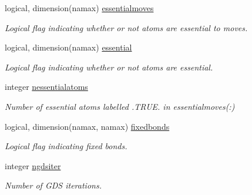 \begin{DoxyCompactItemize}
\mbox{\label{namespaceglobaldata_a34e914358ed9a59f55c77ae70decd561}} 
logical, dimension(namax) \mbox{\hyperlink{namespaceglobaldata_a34e914358ed9a59f55c77ae70decd561}{essentialmoves}}
\begin{DoxyCompactList}\small\item\em Logical flag indicating whether or not atoms are essential to moves. \end{DoxyCompactList}\item 
\mbox{\label{namespaceglobaldata_a3f9ae6a1127a93e815684c8d0b837e97}} 
logical, dimension(namax) \mbox{\hyperlink{namespaceglobaldata_a3f9ae6a1127a93e815684c8d0b837e97}{essential}}
\begin{DoxyCompactList}\small\item\em Logical flag indicating whether or not atoms are essential. \end{DoxyCompactList}\item 
\mbox{\label{namespaceglobaldata_af314b28c5da8f35ed9158b77b3ea04b9}} 
integer \mbox{\hyperlink{namespaceglobaldata_af314b28c5da8f35ed9158b77b3ea04b9}{nessentialatoms}}
\begin{DoxyCompactList}\small\item\em Number of essential atoms labelled .T\+R\+UE. in essentialmoves(\+:) \end{DoxyCompactList}\item 
\mbox{\label{namespaceglobaldata_a09b1518c554179f8c18ab4d5b55d6186}} 
logical, dimension(namax, namax) \mbox{\hyperlink{namespaceglobaldata_a09b1518c554179f8c18ab4d5b55d6186}{fixedbonds}}
\begin{DoxyCompactList}\small\item\em Logical flag indicating fixed bonds. \end{DoxyCompactList}\item 
\mbox{\label{namespaceglobaldata_a373c92412bc31706c504ae5919e4dd91}} 
integer \mbox{\hyperlink{namespaceglobaldata_a373c92412bc31706c504ae5919e4dd91}{ngdsiter}}
\begin{DoxyCompactList}\small\item\em Number of G\+DS iterations. \end{DoxyCompactList}\item 

\end{DoxyCompactItemize}
